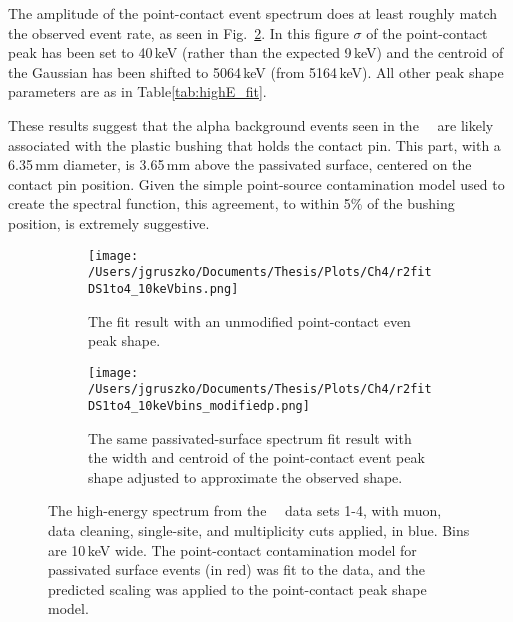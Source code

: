The amplitude of the point-contact event spectrum does at least roughly match the observed event rate, as seen in Fig.~\ref{fig:r2spec_mod}. In this figure $\sigma$ of the point-contact peak has been set to 40\,keV (rather than the expected 9\,keV) and the centroid of the Gaussian has been shifted to 5064\,keV (from 5164\,keV). All other peak shape parameters are as in Table\ref{tab:highE_fit}. 

These results suggest that the alpha background events seen in the \MJ\ \DEM\ are likely associated with the plastic bushing that holds the contact pin. This part, with a 6.35\,mm diameter, is 3.65\,mm above the passivated surface, centered on the contact pin position. Given the simple point-source contamination model used to create the spectral function, this agreement, to within 5\% of the bushing position, is extremely suggestive.   

\begin{figure}[]
 \centering
 \begin{subfigure}[]{\textwidth}
 \centering
 \texttt{[image: /Users/jgruszko/Documents/Thesis/Plots/Ch4/r2fitDS1to4\_10keVbins.png]}
 \caption{The fit result with an unmodified point-contact even peak shape.}
 \label{fig:r2spec_orig}
  \end{subfigure}
 \begin{subfigure}[]{\textwidth}
 \centering
 \texttt{[image: /Users/jgruszko/Documents/Thesis/Plots/Ch4/r2fitDS1to4\_10keVbins\_modifiedp.png]}
  \caption{The same passivated-surface spectrum fit result with the width and centroid of the point-contact event peak shape adjusted to approximate the observed shape.}
 \label{fig:r2spec_mod}
 \end{subfigure}
 \caption[A fit of the point contact contamination model to the \MJ\ \DEM\ energy spectrum]{The high-energy spectrum from the \MJ\ \DEM\, data sets 1-4, with muon, data cleaning, single-site, and multiplicity cuts applied, in blue. Bins are 10\,keV wide. The point-contact contamination model for passivated surface events (in red) was fit to the data, and the predicted scaling was applied to the point-contact peak shape model.} 
 \label{fig:mjSpec_fit}
\end{figure}


